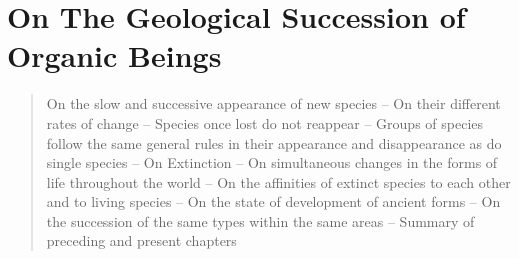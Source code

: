 \chapter{On The Geological Succession of Organic Beings}

\begin{quotation}
On the slow and successive appearance of new species -- On their different rates of change -- Species once lost do not reappear -- Groups of species follow the same general rules in their appearance and disappearance as do single species -- On Extinction -- On simultaneous changes in the forms of life throughout the world -- On the affinities of extinct species to each other and to living species -- On the state of development of ancient forms -- On the succession of the same types within the same areas -- Summary of preceding and present chapters
\end{quotation}

